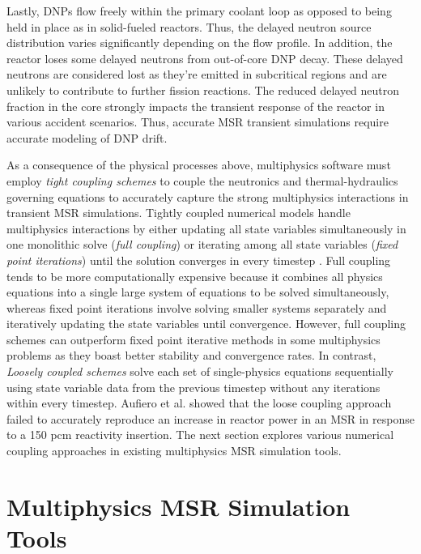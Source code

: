 Lastly, \glspl{DNP} flow freely within the primary coolant loop as opposed to
being held in place as in solid-fueled reactors. Thus, the delayed neutron
source distribution varies significantly depending on the flow profile. In
addition,
the reactor loses some delayed neutrons from out-of-core \gls{DNP} decay. These
delayed neutrons are considered lost as they're emitted in subcritical regions
and are unlikely to contribute to further fission reactions. The reduced
delayed neutron fraction in the core strongly impacts the transient response of
the reactor in various accident scenarios. Thus, accurate \gls{MSR} transient
simulations require accurate modeling of \gls{DNP} drift.

As a consequence of the physical processes above, multiphysics
software must employ \textit{tight coupling schemes} to couple the neutronics
and thermal-hydraulics governing equations to accurately capture the strong
multiphysics interactions in transient \gls{MSR} simulations. Tightly coupled
numerical models handle multiphysics interactions by either updating all state
variables simultaneously in one monolithic solve (\textit{full coupling}) or
iterating among all state variables (\textit{fixed point iterations}) until the
solution converges in every timestep \cite{keyes_multiphysics_2013}. Full
coupling tends to be more computationally expensive because it combines all
physics equations into a single large system of equations to be solved
simultaneously, whereas fixed point iterations involve solving smaller systems
separately and iteratively updating the state variables until convergence.
However, full coupling schemes can outperform fixed point iterative methods in
some multiphysics problems as they boast better stability and convergence
rates. In contrast, \textit{Loosely coupled schemes} solve each set of
single-physics equations sequentially using state variable data from the
previous timestep without any iterations within every timestep. Aufiero et al.
\cite{aufiero_development_2014} showed that the loose coupling approach failed
to accurately reproduce an increase in reactor power in an \gls{MSR} in
response to a 150 pcm reactivity insertion. The next section explores various
numerical coupling approaches in existing multiphysics \gls{MSR} simulation
tools.

\section{Multiphysics MSR Simulation Tools}

